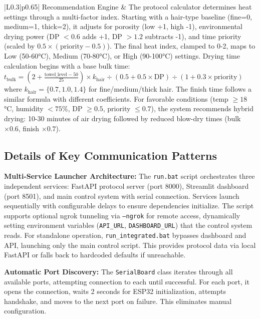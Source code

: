 \documentclass[11pt,a4paper]{article}
\begin{document}
\begin{longtable}{|L{0.3\textwidth}|p{0.65\textwidth}|}
\hline
Recommendation Engine & The protocol calculator determines heat settings through a multi-factor index. Starting with a hair-type baseline (fine=0, medium=1, thick=2), it adjusts for porosity (low +1, high -1), environmental drying power (DP $< 0.6$ adds +1, DP $> 1.2$ subtracts -1), and time priority (scaled by $0.5 \times (\text{priority} - 0.5)$). The final heat index, clamped to 0-2, maps to Low (50-60°C), Medium (70-80°C), or High (90-100°C) settings. Drying time calculation begins with a base bulk time: $t_{\text{bulk}} = \left(2 + \frac{\text{towel\_level} - 50}{25}\right) \times k_{\text{hair}} \div \left(0.5 + 0.5 \times \text{DP}\right) \div \left(1 + 0.3 \times \text{priority}\right)$ where $k_{\text{hair}} = \{0.7, 1.0, 1.4\}$ for fine/medium/thick hair. The finish time follows a similar formula with different coefficients. For favorable conditions (temp $\geq 18$°C, humidity $< 75\%$, DP $\geq 0.5$, priority $\leq 0.7$), the system recommends hybrid drying: 10-30 minutes of air drying followed by reduced blow-dry times (bulk $\times 0.6$, finish $\times 0.7$). \\
\hline
\end{longtable}

\subsection{Details of Key Communication Patterns}

\textbf{Multi-Service Launcher Architecture:} The \texttt{run.bat} script orchestrates three independent services: FastAPI protocol server (port 8000), Streamlit dashboard (port 8501), and main control system with serial connection. Services launch sequentially with configurable delays to ensure dependencies initialize. The script supports optional ngrok tunneling via \texttt{--ngrok} for remote access, dynamically setting environment variables (\texttt{API\_URL}, \texttt{DASHBOARD\_URL}) that the control system reads. For standalone operation, \texttt{run\_integrated.bat} bypasses dashboard and API, launching only the main control script. This provides protocol data via local FastAPI or falls back to hardcoded defaults if unreachable.

\textbf{Automatic Port Discovery:} The \texttt{SerialBoard} class iterates through all available ports, attempting connection to each until successful. For each port, it opens the connection, waits 2 seconds for ESP32 initialization, attempts handshake, and moves to the next port on failure. This eliminates manual configuration.
\end{document}
